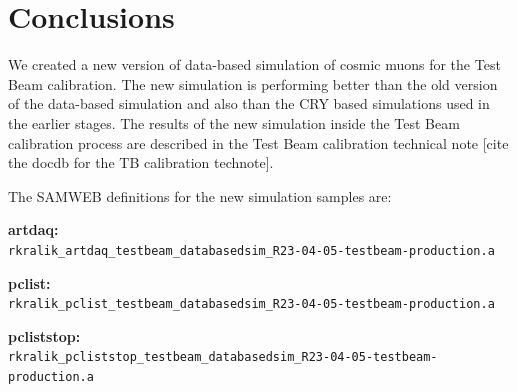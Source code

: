 \documentclass[12pt]{article}
\begin{document}
\section{Conclusions}
We created a new version of data-based simulation of cosmic muons for the Test Beam calibration. The new simulation is performing better than the old version of the data-based simulation and also than the CRY based simulations used in the earlier stages. The results of the new simulation inside the Test Beam calibration process are described in the Test Beam calibration technical note [cite the docdb for the TB calibration technote].

The SAMWEB definitions for the new simulation samples are:

\textbf{artdaq:}\\
\texttt{rkralik\_artdaq\_testbeam\_databasedsim\_R23-04-05-testbeam-production.a}

\textbf{pclist:}\\
\texttt{rkralik\_pclist\_testbeam\_databasedsim\_R23-04-05-testbeam-production.a}

\textbf{pcliststop:}\\
\texttt{rkralik\_pcliststop\_testbeam\_databasedsim\_R23-04-05-testbeam-production.a}



\end{document}
